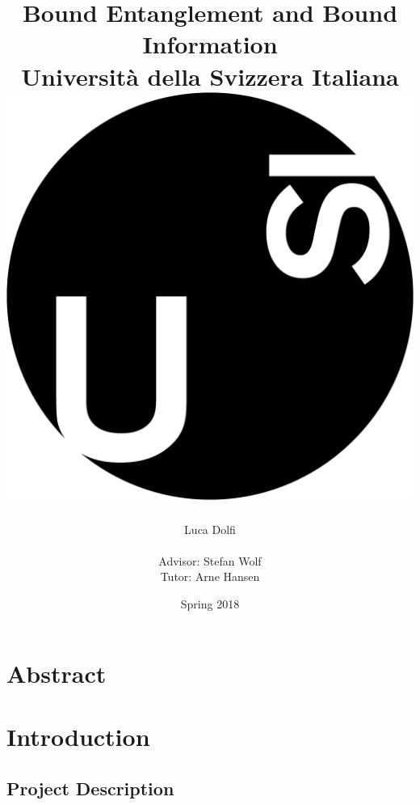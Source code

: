 \documentclass[titlepage]{report}
\title{
	{Bound Entanglement and Bound Information}\\
	{\large Universit\`a della Svizzera Italiana}\\
	{\includegraphics[scale=0.12]{images/usi-immagini-logo-formatted.png}}
}
\author{Luca Dolfi\\ \\ Advisor: Stefan Wolf \\ Tutor: Arne Hansen}
\date{Spring 2018}
\begin{document}
\maketitle
\chapter*{Abstract}
\tableofcontents
\chapter{Introduction}
\lipsum[1]


\section*{Project Description}
\lipsum[2]
\end{document}
